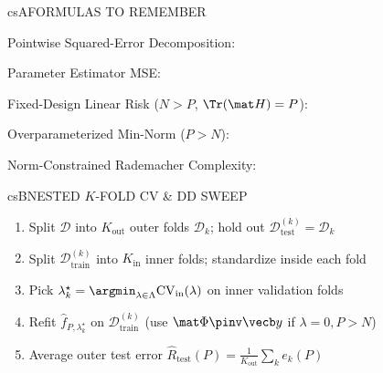 \documentclass[../../../../master.tex]{subfiles}
\begin{document}

\csnextpage

\begin{cscolumns}
\begin{cscard}{csA}{FORMULAS TO REMEMBER}
  \begin{csbul}
    \item Pointwise Squared-Error Decomposition:
    \item Parameter Estimator MSE:
    \item Fixed-Design Linear Risk ($N>P$, $\Tr(\mat H)=P$):
    \item Overparameterized Min-Norm ($P>N$):
    \item Norm-Constrained Rademacher Complexity:
  \end{csbul}
\end{cscard}

\begin{cscard}{csB}{NESTED $K$-FOLD CV \& DD SWEEP}
  \begin{enumerate}[leftmargin=1.2em, itemsep=1pt, topsep=1pt, parsep=0pt]
    \item Split $\mathcal D$ into $K_{\mathrm{out}}$ outer folds $\mathcal D_k$; hold out $\mathcal D_{\mathrm{test}}^{(k)}=\mathcal D_k$
    \item Split $\mathcal D_{\mathrm{train}}^{(k)}$ into $K_{\mathrm{in}}$ inner folds; standardize inside each fold
    \item Pick $\lambda_k^\star=\argmin_{\lambda\in\Lambda}\mathrm{CV}_{\mathrm{in}}(\lambda)$ on inner validation folds
    \item Refit $\hat f_{P,\lambda_k^\star}$ on $\mathcal D_{\mathrm{train}}^{(k)}$ (use $\mat\Phi\pinv\vecb y$ if $\lambda=0, P>N$)
    \item Average outer test error $\hat R_{\mathrm{test}}(P)=\frac{1}{K_{\mathrm{out}}}\sum_k e_k(P)$
  \end{enumerate}
\end{cscard}
\columnbreak


\end{cscolumns}
\end{document}
